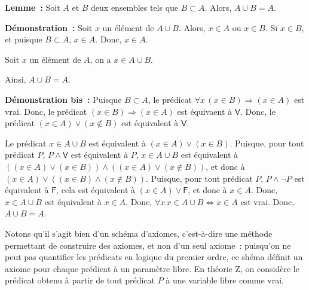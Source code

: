 \done

\medskip

\noindent\textbf{Lemme :} Soit $A$ et $B$ deux ensembles tels que $B \subset A$.
    Alors, $A \cup B = A$.

\medskip

\noindent\textbf{Démonstration :}
    Soit $x$ un élément de $A \cup B$. 
    Alors, $x \in A$ ou $x \in B$.
    Si $x \in B$, et puisque $B \subset A$, $x \in A$.
    Donc, $x \in A$.

    Soit $x$ un élément de $A$, on a $x \in A \cup B$.

    Ainsi, $A \cup B = A$.

    \done

\medskip

\noindent\textbf{Démonstration bis :} 
    Puisque $B \subset A$, le prédicat $\forall x \, (x \in B) \Rightarrow (x \in A)$ est vrai.
    Donc, le prédicat $(x \in B) \Rightarrow (x \in A)$ est équivaent à $\mathsf{V}$.
    Donc, le prédicat $(x \in A) \vee (x \notin B)$ est équivalent à $\mathsf{V}$.
    
    Le prédicat $x \in A \cup B$ est équivalent à $(x \in A) \vee (x \in B)$.
    Puisque, pour tout prédicat $P$, $P \wedge \mathsf{V}$ est équivalent à $P$, $x \in A \cup B$ est équivalent à $((x \in A) \vee (x \in B)) \wedge ((x \in A) \vee (x \notin B))$, et donc à $(x \in A) \vee ((x \in B) \wedge (x \notin B))$.
    Puisque, pour tout prédicat $P$, $P \wedge \neg P$ est équivalent à $\mathsf{F}$, cela est équivalent à $(x \in A) \vee \mathsf{F}$, et donc à $x \in A$.
    Donc, $x \in A \cup B$ est équivalent à $x \in A$.
    Donc, $\forall x \, x \in A \cup B \Leftrightarrow x \in A$ est vrai.
    Donc, $A \cup B = A$.

\done

\medskip

Notons qu'il s'agit bien d'un schéma d'axiomes, c'est-à-dire une méthode permettant de construire des axiomes, et non d'un seul axiome : puisqu'on ne peut pas quantifier les prédicats en logique du premier ordre, ce shéma définit un axiome pour chaque prédicat à un paramètre libre. 
En théorie Z, on considère le prédicat obtenu à partir de tout prédicat $P$ à une variable libre comme vrai.

